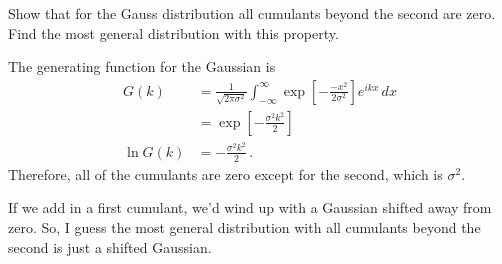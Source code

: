 

Show that for the Gauss distribution all cumulants beyond the second are zero.
Find the most general distribution with this property.


The generating function for the Gaussian is
\begin{align*}
  G(k)
  &= \frac{1}{\sqrt{2 \pi \sigma^2}} \int_{-\infty}^\infty
    \exp \left[ - \frac{-x^2}{2 \sigma^2} \right] e^{i k x} \, dx \\
  &= \exp \left[ - \frac{\sigma^2 k^2}{2} \right] \\
    \ln G(k)
  &= - \frac{\sigma^2 k^2}{2} \, .
\end{align*}
Therefore, all of the cumulants are zero except for the second, which is $\sigma^2$.

If we add in a first cumulant, we'd wind up with a Gaussian shifted away from zero.
So, I guess the most general distribution with all cumulants beyond the second is just a shifted Gaussian.
